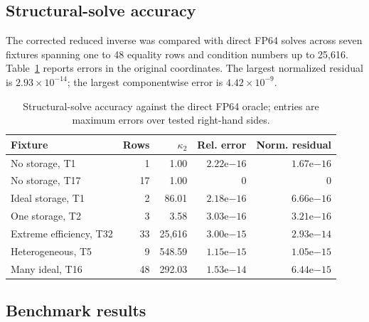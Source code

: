 \documentclass[10pt,journal]{IEEEtran}
\begin{document}
\subsection{Structural-solve accuracy}

The corrected reduced inverse was compared with direct FP64 solves across
seven fixtures spanning one to 48 equality rows and condition numbers up to
25,616. Table~\ref{tab:conditioning} reports errors in the original
coordinates. The largest normalized residual is $2.93\times10^{-14}$; the
largest componentwise error is $4.42\times10^{-9}$.

\begin{table}[!t]
\caption{Structural-solve accuracy against the direct FP64 oracle; entries are
maximum errors over tested right-hand sides.}
\label{tab:conditioning}
\centering
\scriptsize
\setlength{\tabcolsep}{2.2pt}
\renewcommand{\arraystretch}{0.92}
\begin{tabular}{@{}lrrrr@{}}
\toprule
Fixture & Rows & $\kappa_2$ & Rel. error & Norm. residual \\
\midrule
No storage, T1 & 1 & 1.00 & $2.22\mathrm{e}{-16}$ & $1.67\mathrm{e}{-16}$ \\
No storage, T17 & 17 & 1.00 & 0 & 0 \\
Ideal storage, T1 & 2 & 86.01 & $2.18\mathrm{e}{-16}$ &
$6.66\mathrm{e}{-16}$ \\
One storage, T2 & 3 & 3.58 & $3.03\mathrm{e}{-16}$ &
$3.21\mathrm{e}{-16}$ \\
Extreme efficiency, T32 & 33 & 25,616 & $3.00\mathrm{e}{-15}$ &
$2.93\mathrm{e}{-14}$ \\
Heterogeneous, T5 & 9 & 548.59 & $1.15\mathrm{e}{-15}$ &
$1.05\mathrm{e}{-15}$ \\
Many ideal, T16 & 48 & 292.03 & $1.53\mathrm{e}{-14}$ &
$6.44\mathrm{e}{-15}$ \\
\bottomrule
\end{tabular}
\end{table}

\subsection{Benchmark results}
\end{document}
